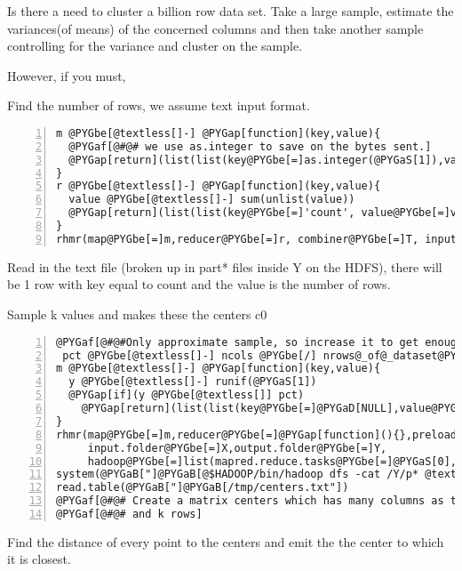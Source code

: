 \documentclass[letterpaper,10pt,english]{manual}
\begin{document}
Is there a need to cluster a billion row data set. Take a large sample, estimate the variances(of means) of the concerned columns and then take another sample controlling for the variance and cluster on the sample.

However, if you must,

Find the number of rows, we assume text input format.

\begin{Verbatim}[commandchars=@\[\],numbers=left,firstnumber=1,stepnumber=1]
m @PYGbe[@textless[]-] @PYGap[function](key,value){
  @PYGaf[@#@# we use as.integer to save on the bytes sent.]
  @PYGap[return](list(list(key@PYGbe[=]as.integer(@PYGaS[1]),value@PYGbe[=]@PYGaS[1])))
}
r @PYGbe[@textless[]-] @PYGap[function](key,value){
  value @PYGbe[@textless[]-] sum(unlist(value))
  @PYGap[return](list(list(key@PYGbe[=]'count', value@PYGbe[=]value)))
}
rhmr(map@PYGbe[=]m,reducer@PYGbe[=]r, combiner@PYGbe[=]T, input.folder@PYGbe[=]X,output.folder@PYGbe[=]Y)
\end{Verbatim}

Read in the text file (broken up in part* files inside Y on the HDFS), there will be 1 row with key equal to count and the value is the number of rows.

Sample k values and makes these the centers c0

\begin{Verbatim}[commandchars=@\[\],numbers=left,firstnumber=1,stepnumber=1]
 @PYGaf[@#@#Only approximate sample, so increase it to get enough.]
 pct @PYGbe[@textless[]-] ncols @PYGbe[/] nrows@_of@_dataset@PYGbe[*]@PYGaS[2]
m @PYGbe[@textless[]-] @PYGap[function](key,value){
  y @PYGbe[@textless[]-] runif(@PYGaS[1])
  @PYGap[if](y @PYGbe[@textless[]] pct)
    @PYGap[return](list(list(key@PYGbe[=]@PYGaD[NULL],value@PYGbe[=]value)))
}
rhmr(map@PYGbe[=]m,reducer@PYGbe[=]@PYGap[function](){},preload@PYGbe[=]list(env@PYGbe[=]c('pct')),
     input.folder@PYGbe[=]X,output.folder@PYGbe[=]Y,
     hadoop@PYGbe[=]list(mapred.reduce.tasks@PYGbe[=]@PYGaS[0],rhipejob.kvsep@PYGbe[=]''))
system(@PYGaB["]@PYGaB[@$HADOOP/bin/hadoop dfs -cat /Y/p* @textgreater[] /tmp/centers.txt"])
read.table(@PYGaB["]@PYGaB[/tmp/centers.txt"])
@PYGaf[@#@# Create a matrix centers which has many columns as there are in there dataset]
@PYGaf[@#@# and k rows]
\end{Verbatim}

Find the distance of every point to the centers and emit the the center to which it is closest.
\end{document}
